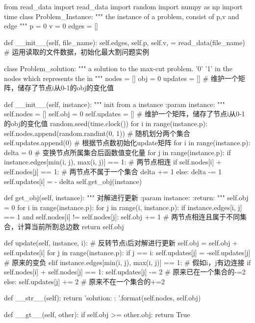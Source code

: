 \documentclass{article}
\begin{document}
    \begin{python}
from read_data import read_data
import random
import numpy as np
import time
class Problem_Instance:
    """
    the instance of a problem, consist of p,v and edge
    """
    p = 0
    v = 0
    edges = []

    def __init__(self, file_name):
        self.edges, self.p, self.v, = read_data(file_name)  # 运用读取的文件数据，初始化最大割问题实例


class Problem_solution:
    """
    a solution to the max-cut problem. '0' '1'  in the nodes which represents the in
    """
    nodes = []
    obj = 0
    updates = []  # 维护一个矩阵，储存了节点i从0-1的obj的变化值

    def __init__(self, instance):
        """
        init from a instance
        :param instance:
        """
        self.nodes = []
        self.obj = 0
        self.updates = []  # 维护一个矩阵，储存了节点i从0-1的obj的变化值
        random.seed(time.clock())
        for i in range(instance.p):
            self.nodes.append(random.randint(0, 1))  # 随机划分两个集合
            self.updates.append(0)  # 根据节点数初始化update矩阵
        for i in range(instance.p):
            delta = 0  # 变换节点所属集合后函数值变化量
            for j in range(instance.p):
                if instance.edges[min(i, j), max(i, j)] == 1:  # 两节点相连
                    if self.nodes[i] + self.nodes[j] == 1:  # 两节点不属于一个集合
                        delta += 1
                    else:
                        delta -= 1
            self.updates[i] = - delta
        self.get_obj(instance)

    def get_obj(self, instance):
        """
        对解进行更新
        :param instance:
        :return:
        """
        self.obj = 0
        for i in range(instance.p):
            for j in range(i, instance.p):
                if instance.edges[i, j] == 1 and self.nodes[i] != self.nodes[j]:
                    self.obj += 1  # 两节点相连且属于不同集合，计算当前所割总边数
        return self.obj

    def update(self, instance, i):  # 反转节点i后对解进行更新
        self.obj = self.obj + self.updates[i]
        for j in range(instance.p):
            if j == i:
                self.updates[j] = -self.updates[j]  # 原来的变负
            elif instance.edges[min(i, j), max(i, j)] == 1:  # 假如i，j有边连接
                if self.nodes[i] + self.nodes[j] == 1:
                    self.updates[j] -= 2  # 原来已在一个集合的-=2
                else:
                    self.updates[j] += 2  # 原来不在一个集合的+=2

    def __str__(self):
        return 'solution: {}\nobjective: {}'.format(self.nodes, self.obj)

    def __gt__(self, other):
        if self.obj >= other.obj:
            return True

    \end{python}
\end{document}
